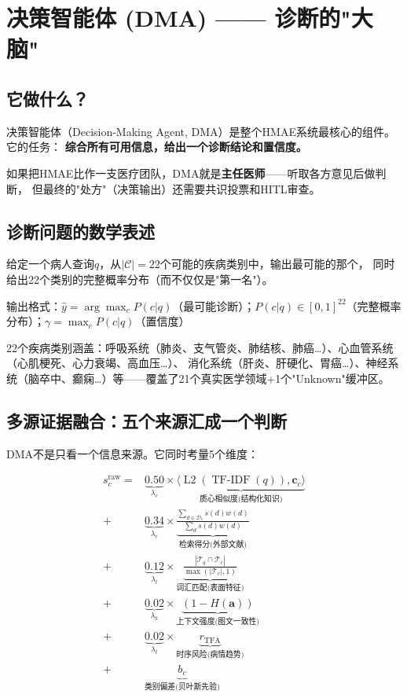 \documentclass[11pt,a4paper]{ctexart}
\DeclareMathOperator{\Ltwo}{L2}
\DeclareMathOperator{\TFIDF}{TF-IDF}
\begin{document}
\newpage

\section{决策智能体 (DMA) —— 诊断的"大脑"}

\subsection{它做什么？}

决策智能体（Decision-Making Agent, DMA）是整个HMAE系统最核心的组件。它的任务：
\textbf{综合所有可用信息，给出一个诊断结论和置信度。}

如果把HMAE比作一支医疗团队，DMA就是\textbf{主任医师}——听取各方意见后做判断，
但最终的"处方"（决策输出）还需要共识投票和HITL审查。

\subsection{诊断问题的数学表述}

\begin{defbox}[诊断 = 多类别概率分类问题]
给定一个病人查询$q$，从$|\mathcal{C}|=22$个可能的疾病类别中，输出最可能的那个，
同时给出22个类别的完整概率分布（而不仅仅是"第一名"）。

输出格式：$\hat{y} = \arg\max_c P(c|q)$（最可能诊断）；$P(c|q) \in [0,1]^{22}$（完整概率分布）；$\gamma = \max_c P(c|q)$（置信度）
\end{defbox}

22个疾病类别涵盖：呼吸系统（肺炎、支气管炎、肺结核、肺癌…）、心血管系统（心肌梗死、心力衰竭、高血压…）、
消化系统（肝炎、肝硬化、胃癌…）、神经系统（脑卒中、癫痫…）等——覆盖了21个真实医学领域+1个"Unknown"缓冲区。

\subsection{多源证据融合：五个来源汇成一个判断}

DMA不是只看一个信息来源。它同时考量5个维度：

\begin{align*}
s_c^{\text{raw}} = &\underbrace{0.50}_{\lambda_c} \times \underbrace{\langle \Ltwo(\TFIDF(q)), \mathbf{c}_c \rangle}_{\text{质心相似度(结构化知识)}} \\
+ &\underbrace{0.34}_{\lambda_r} \times \underbrace{\frac{\sum_{d \in \mathcal{D}_c} s(d) w(d)}{\sum_d s(d) w(d)}}_{\text{检索得分(外部文献)}} \\
+ &\underbrace{0.12}_{\lambda_l} \times \underbrace{\frac{|\mathcal{T}_q \cap \mathcal{T}_c|}{\max(|\mathcal{T}_c|, 1)}}_{\text{词汇匹配(表面特征)}} \\
+ &\underbrace{0.02}_{\lambda_k} \times \underbrace{(1 - H(\mathbf{a}))}_{\text{上下文强度(图文一致性)}} \\
+ &\underbrace{0.02}_{\lambda_t} \times \underbrace{r_{\text{TFA}}}_{\text{时序风险(病情趋势)}} \\
+ &\underbrace{b_c}_{\text{类别偏差(贝叶斯先验)}}
\end{align*}
\end{document}

